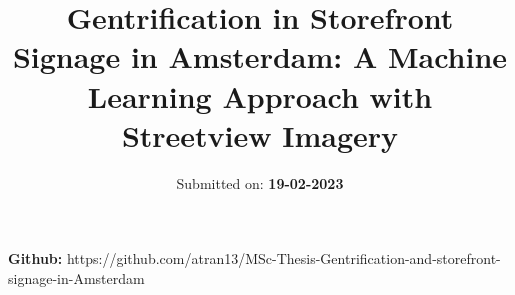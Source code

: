 \documentclass[nolinenumbering]{thesisdesign}
\title{Gentrification in Storefront Signage in Amsterdam: A Machine Learning Approach with Streetview Imagery}
\subtitle{Submitted on: \textbf{19-02-2023}}
\affiliation{
    \institution{\thesisinstitution}
    \city{\thesiscity}
    \country{\thesiscountry}
}
\affiliation{
    \institution{\thesisinstitution}
    \city{\thesiscity}
    \country{\thesiscountry}
}
\begin{document}
\pagestyle{plain}
\setcounter{page}{1}
\fixemptypage

\maketitle

\textbf{Github:} https://github.com/atran13/MSc-Thesis-Gentrification-and-storefront-signage-in-Amsterdam 









\end{document}
